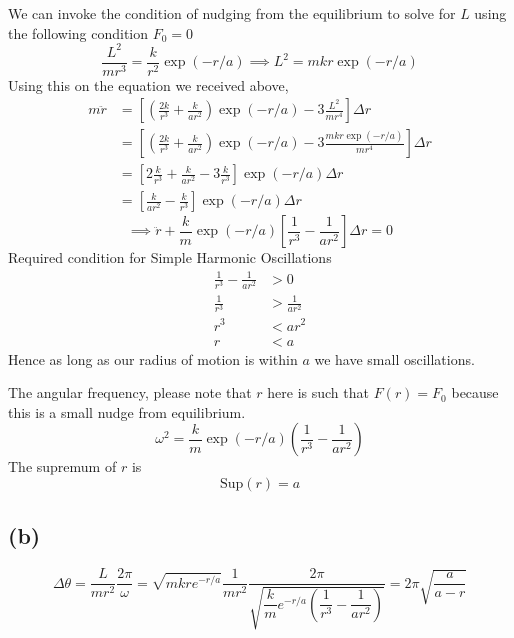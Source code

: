\documentclass[letter, 10pts]{article}
\begin{document}
We can invoke the condition of nudging from the equilibrium to solve for $L$ using the following condition $F_0 = 0$ 
\[
\frac{L^2}{mr^3} = \frac{k}{r^2} \exp(-r /a) \implies L^2 =  m k r \exp(-r /a )
\] 
Using this on the equation we received above, 
\begin{align*}
	m \ddot{r} 
	&=	\left[
	\left(\frac{2k}{r^3} + \frac{k}{a r^2} \right) \exp ( -r / a) - 3 \frac{L^2}{mr^{4}} 
\right] \Delta r
\\	
	&=	\left[
	\left(\frac{2k}{r^3} + \frac{k}{a r^2} \right) \exp ( -r / a) - 3 \frac{ m k r \exp( - r /a)}{mr^{4}} 
\right] \Delta r
\\	
	&=	\left[
2\frac{k}{r^3} + \frac{k}{a r^2} - 3 \frac{ k  }{r^{3}} 
\right] \exp( - r / a)\Delta r
\\	
	&=	\left[
 \frac{k}{a r^2} -  \frac{ k  }{r^{3}} 
\right] \exp( - r / a)\Delta r
\end{align*}
\[ \implies 
\ddot{r} + \frac{k}{m} \exp(- r / a) \left[  \frac{1}{r^3} - \frac{1}{ar ^2} \right] \Delta r
= 0 
\]
Required condition for Simple Harmonic Oscillations
\begin{align*}
	\frac{1}{r^3} - \frac{1}{a r^2} &> 0 
	\\
	\frac{1}{r^3} &> \frac{1}{ar^2}
	\\
	r^3 &< ar^2
	\\
	r &< a
\end{align*} 
Hence as long as our radius of motion is within $a$ we have small oscillations. 

The angular frequency, please note that $r$ here is such that $F(r) = F_0$ because this is a small nudge from equilibrium.
\[
\omega^2 = 
\frac{k}{m} \exp(- r / a) \left(
\frac{1}{r^3} - \frac{1}{a r^2}
\right)
\]
The supremum of $r$ is 
\[
\text{Sup}(r) = a
\] 

\subsection*{(b)}
\[
	\Delta \theta = \frac{L}{m r^2} \frac{2\pi}{\omega} = \sqrt{m k r e^{- {r / }{ a}}} \frac{1}{m r^2} \dfrac{2\pi}{\sqrt{ \dfrac{k}{m} e^{- r / a}\left(\dfrac{1}{r^3} - \dfrac{1}{ar^2} \right) }  }  
	= 2 \pi \sqrt{\frac{a}{a- r}} 
\]
\end{document}
